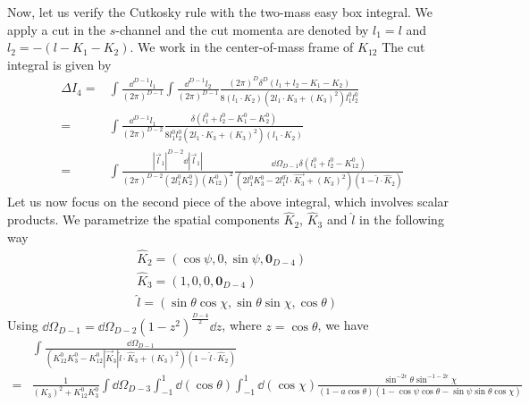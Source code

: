 Now, let us verify the Cutkosky rule with the two-mass easy box integral.
We apply a cut in the $s$-channel and the cut momenta are denoted by $l_1 = l$ and $l_2 = -( l-K_1-K_2)$.
We work in the center-of-mass frame of $K_{12}$
The cut integral is given by
\begin{equation}\label{cuti4}
\begin{split}
\Delta I_4 =&
\int\frac{\dd^{D-1}l_1}{(2\pi)^{D-1}} 
 \int\frac{\dd^{D-1}l_2}{(2\pi)^{D-1}}
\frac{(2\pi)^D\delta^{D}(l_1 + l_2 - K_1- K_2)}{8(l_1\cdot K_2)(2l_1\cdot K_3 + (K_3)^2)l_1^0 l_2^0} 
\\
 = & 
\int\frac{\dd^{D-1}l_1}{(2\pi)^{D-2}} 
\frac{\delta(l_1^0 + l_2^0 - K_1^0 - K_2^0)}{8 l_1^0 l_2^0 (2l_1\cdot K_3 + (K_3)^2)(l_1\cdot K_2)}
\\
 = & \int\frac{|\vec{l}_1|^{D-2} \dd |\vec{l}_1|}{(2\pi)^{D-2}(2l_1^0 K_2^0)(K_{12}^0)^2}
\frac{\dd \Omega_{D-1} \delta(l_1^0 + l_2^0 - K^0_{12})}{(2l_1^0 K_3^0 - 2l_1^0 \hat{l}\cdot\vec{K_3} + (K_3)^2)(1-\hat{l}\cdot \hat{K}_2)}
\end{split}
\end{equation}
Let us now focus on the second piece of the above integral, which involves scalar products. 
We parametrize the spatial components $\hat{K}_2$, $\hat{K}_3$ and $\hat{l}$ in the following way
\begin{equation}\label{spatial_param}
\begin{split}
& \hat{K}_2 = (\cos\psi, 0, \sin \psi, \mathbf{0}_{D-4})
\\
& \hat{K}_3 = (1,0,0,\mathbf{0}_{D-4})
\\
& \hat{l} = (\sin\theta\cos\chi, \sin\theta\sin\chi,\cos\theta)
\end{split}
\end{equation}
Using $\dd\Omega_{D-1} = \dd \Omega_{D-2}(1-z^2)^{\frac{D-4}{2}}\dd z$, where $z = \cos\theta$, 
we have
\begin{equation}\label{omega11}
\begin{split}
& \int\frac{\dd \Omega_{D-1}}{(K_{12}^0 K_3^0 - K_{12}^0 |\vec{K}_3| \hat{l}\cdot \hat{K}_3 + (K_3)^2)(1-\hat{l}\cdot\hat{K}_2)}
\\
= & \frac{1}{(K_3)^2 + K_{12}^0 K_3^0}\int \dd \Omega_{D-3}
\int_{-1}^1 \dd(\cos\theta)\int_{-1}^1\dd(\cos \chi)\frac{\sin^{-2\epsilon}\theta \sin^{-1-2\epsilon}\chi}{(1-a\cos\theta)(1-\cos\psi\cos\theta  - \sin\psi\sin\theta\cos\chi)}
\end{split}
\end{equation}
